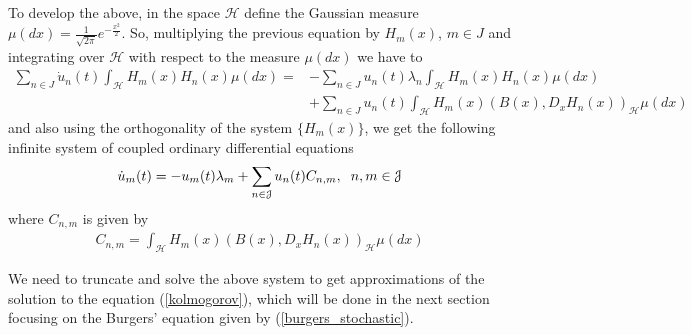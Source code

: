 	To develop the above, in the space $\mathcal{H}$ define the Gaussian measure $\mu (dx) = \frac{1}{\sqrt{2 \pi}} e^{- \frac{x^2 }{2}}$. So, multiplying the previous equation by $H_m (x)$, $m \in J$ and integrating over $\mathcal{H}$ with respect to the measure $\mu(dx)$ we have to
	\begin{align*}
		\displaystyle \sum_{n \in J}  \dot{u}_n (t) \int_{\mathcal{H}} H_m (x) H_n (x) \mu (dx) = &- \sum_{n \in J} u_n (t) \lambda_n \int_{\mathcal{H}} H_m (x)  H_n (x) \mu (dx) \\
		&+ \sum_{n \in J} u_n (t) \int_{\mathcal{H}} H_m (x) \left( B(x), D_x H_n (x) \right)_{\mathcal{H}} \mu (dx)
	\end{align*}
	and also using the orthogonality of the system $\{H_m (x) \}$, we get the following infinite system of coupled ordinary differential equations
	\begin{align}
		\label{infinite_system}
		\dot{u}_{m} (t) = -u_{m} (t) \lambda_{m} + \displaystyle \sum _{n \in \mathcal{J}} u_{n} (t) C_{n, m} , \hspace{2mm} n, m \in \mathcal{J}	
	\end{align}\textbf{}
	where $C_{n, m}$ is given by
	\begin{align}
		\label{Cnm}
		C_{n, m} = \displaystyle  \int_{\mathcal{H}} H_m (x) \left( B(x), D_x H_n (x) \right)_{\mathcal{H}} \mu (dx)
	\end{align} 

	We need to truncate and solve the above system to get approximations of the solution to the equation (\ref{kolmogorov}), which will be done in the next section focusing on the Burgers' equation given by (\ref{burgers_stochastic}).